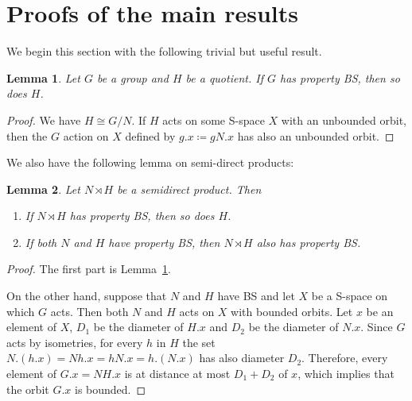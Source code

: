 \documentclass[a4paper]{article}
\newtheorem{lem}{Lemma}[section]
\theoremstyle{definition}
\begin{document}
\section{Proofs of the main results}
\label{Section:Proof}
%
%
%
We begin this section with the following trivial but useful result.
%
%
\begin{lem}\label{Lemma:Quotient}
Let $G$ be a group and $H$ be a quotient.
If $G$ has property BS, then so does $H$.
\end{lem}
\begin{proof}
We have $H\cong G/N$. If $H$ acts on some S-space $X$ with an unbounded orbit, then the $G$ action on $X$ defined by $g.x\coloneqq gN.x$ has also an unbounded orbit.
\end{proof}
%
%
We also have the following lemma on semi-direct products:
%
%
\begin{lem}\label{Lemma:Semidirect}
Let $N\rtimes H$ be a semidirect product. Then
\begin{enumerate}
\item
If $N\rtimes H$ has property BS, then so does $H$.
\item
If both $N$ and $H$ have property BS, then $N\rtimes H$ also has property BS.
\end{enumerate}
\end{lem}
\begin{proof}
The first part is Lemma~\ref{Lemma:Quotient}.

On the other hand, suppose that $N$ and $H$ have BS and let $X$ be a S-space on which $G$ acts.
Then both $N$ and $H$ acts on $X$ with bounded orbits.
Let $x$ be an element of $X$, $D_1$ be the diameter of $H.x$ and $D_2$ be the diameter of $N.x$.
Since $G$ acts by isometries, for every $h$ in $H$ the set $N.(h.x)=Nh.x=hN.x=h.(N.x)$ has also diameter $D_2$.
Therefore, every element of $G.x=NH.x$ is at distance at most $D_1+D_2$ of $x$, which implies that the orbit $G.x$ is bounded. %
\end{proof}
\end{document}
